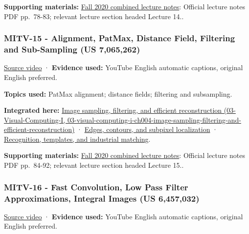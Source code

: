 \textbf{Supporting materials:} \href{https://ocw.mit.edu/courses/6-801-machine-vision-fall-2020/9ec44f69e72995c370b3797818ba01e6_MIT6_801F20_lectureNotes.pdf}{Fall 2020 combined lecture notes}: Official lecture notes PDF pp.~78-83; relevant lecture section headed Lecture 14..

\subsubsection{MITV-15 - Alignment, PatMax, Distance Field, Filtering and Sub-Sampling (US 7,065,262)}\label{04-visual-computing-ii-ch036-mitv-15---alignment-patmax-distance-field-filtering-and-sub-sampling-us-7065262}

\href{https://www.youtube.com/watch?v=R1yLwFOfwwc}{Source video} · \textbf{Evidence used:} YouTube English automatic captions, original English preferred.

\textbf{Topics used:} PatMax alignment; distance fields; filtering and subsampling.

\textbf{Integrated here:} \href{../03-Visual-Computing-I/main.pdf\#nameddest=03-visual-computing-i-ch004-image-sampling-filtering-and-efficient-reconstruction}{Image sampling, filtering, and efficient reconstruction (03-Visual-Computing-I, 03-visual-computing-i-ch004-image-sampling-filtering-and-efficient-reconstruction)} · \hyperref[04-visual-computing-ii-ch030-edges-contours-and-subpixel-localization]{Edges, contours, and subpixel localization} · \hyperref[04-visual-computing-ii-ch030-recognition-templates-and-industrial-matching]{Recognition, templates, and industrial matching}.

\textbf{Supporting materials:} \href{https://ocw.mit.edu/courses/6-801-machine-vision-fall-2020/9ec44f69e72995c370b3797818ba01e6_MIT6_801F20_lectureNotes.pdf}{Fall 2020 combined lecture notes}: Official lecture notes PDF pp.~84-92; relevant lecture section headed Lecture 15..

\subsubsection{MITV-16 - Fast Convolution, Low Pass Filter Approximations, Integral Images (US 6,457,032)}\label{04-visual-computing-ii-ch036-mitv-16---fast-convolution-low-pass-filter-approximations-integral-images-us-6457032}

\href{https://www.youtube.com/watch?v=tblzZhYZtvU}{Source video} · \textbf{Evidence used:} YouTube English automatic captions, original English preferred.

